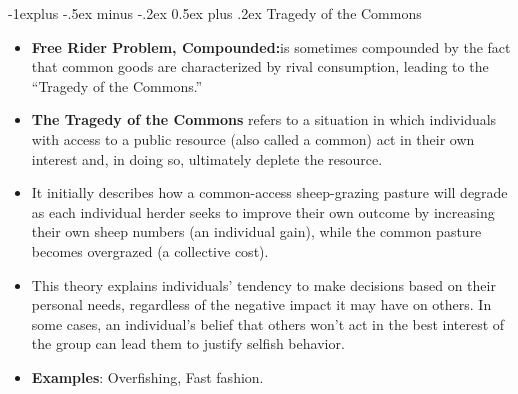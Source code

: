 \documentclass[12pt, landscape]{article}
\makeatletter
\renewcommand{\subsection}{\@startsection{subsection}{2}{0mm}%
                                {-1explus -.5ex minus -.2ex}%
                                {0.5ex plus .2ex}%
                                {\normalfont\normalsize\bfseries}}
\makeatother
\begin{document}
\begin{multicols*}{3}
\subsection{Tragedy of the Commons}
\begin{itemize}
\item \textbf{Free Rider Problem, Compounded:}is sometimes compounded by the fact that common goods are characterized by rival consumption, leading to the “Tragedy of the Commons.”
\item \textbf{The Tragedy of the Commons} refers to a situation in which individuals with access to a public resource (also called a common) act in their own interest and, in doing so, ultimately deplete the resource.
\item It initially describes how a common-access sheep-grazing pasture will degrade as each individual herder seeks to improve their own outcome by increasing their own sheep numbers (an individual gain), while the common pasture becomes overgrazed (a collective cost).
\item This theory explains individuals’ tendency to make decisions based on their personal needs, regardless of the negative impact it may have on others. In some cases, an individual’s belief that others won’t act in the best interest of the group can lead them to justify selfish behavior. 
\item \textbf{Examples}: Overfishing, Fast fashion.
\end{itemize}


\end{multicols*}
\end{document}
